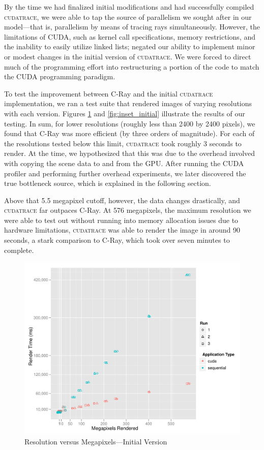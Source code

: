 \documentclass[12pt]{article}
\begin{document}
By the time we had finalized initial modifications and had successfully compiled \textsc{cudatrace}, we were able to tap the source of parallelism we sought after in our model---that is, parallelism by means of tracing rays simultaneously. However, the limitations of CUDA, such as kernel call specifications, memory restrictions, and the inability to easily utilize linked lists; negated our ability to implement minor or modest changes in the initial version of \textsc{cudatrace}. We were forced to direct much of the programming effort into restructuring a portion of the code to match the CUDA programming paradigm.

To test the improvement between C-Ray and the initial \textsc{cudatrace} implementation, we ran a test suite that rendered images of varying resolutions with each version. Figures \ref{fig:cumulative_initial} and \ref{fig:inset_initial} illustrate the results of our testing. In sum, for lower resolutions (roughly less than 2400 by 2400 pixels), we found that C-Ray was more efficient (by three orders of magnitude). For each of the resolutions tested below this limit, \textsc{cudatrace} took roughly 3 seconds to render. At the time, we hypothesized that this was due to the overhead involved with copying the scene data to and from the GPU. After running the CUDA profiler and performing further overhead experiments, we later discovered the true bottleneck source, which is explained in the following section. 

Above that 5.5 megapixel cutoff, however, the data changes drastically, and \textsc{cudatrace} far outpaces C-Ray. At 576 megapixels, the maximum resolution we were able to test out without running into memory allocation issues due to hardware limitations, \textsc{cudatrace} was able to render the image in around 90 seconds, a stark comparison to C-Ray, which took over seven minutes to complete. 

\begin{figure}
    \caption{Resolution versus Megapixels---Initial Version} \label{fig:cumulative_initial}
    \begin{center}
\includegraphics{cudatrace-003}
    \end{center}
\end{figure}
\end{document}
